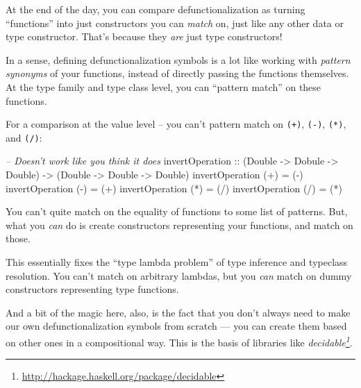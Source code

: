 \documentclass[]{article}
\newenvironment{Shaded}{}{}
\newcommand{\CommentTok}[1]{\textcolor[rgb]{0.38,0.63,0.69}{\textit{#1}}}
\newcommand{\DataTypeTok}[1]{\textcolor[rgb]{0.56,0.13,0.00}{#1}}
\newcommand{\FunctionTok}[1]{\textcolor[rgb]{0.02,0.16,0.49}{#1}}
\newcommand{\NormalTok}[1]{#1}
\newcommand{\OtherTok}[1]{\textcolor[rgb]{0.00,0.44,0.13}{#1}}
\renewcommand{\href}[2]{#2\footnote{\url{#1}}}
\begin{document}
At the end of the day, you can compare defunctionalization as turning
``functions'' into just constructors you can \emph{match} on, just like any
other data or type constructor. That's because they \emph{are} just type
constructors!

In a sense, defining defunctionalization symbols is a lot like working with
\emph{pattern synonyms} of your functions, instead of directly passing the
functions themselves. At the type family and type class level, you can ``pattern
match'' on these functions.

For a comparison at the value level -- you can't pattern match on \texttt{(+)},
\texttt{(-)}, \texttt{(*)}, and \texttt{(/)}:

\begin{Shaded}
\begin{Highlighting}[]
\CommentTok{-- Doesn't work like you think it does}
\OtherTok{invertOperation ::}\NormalTok{ (}\DataTypeTok{Double} \OtherTok{->} \DataTypeTok{Dobule} \OtherTok{->} \DataTypeTok{Double}\NormalTok{) }\OtherTok{->}\NormalTok{ (}\DataTypeTok{Double} \OtherTok{->} \DataTypeTok{Double} \OtherTok{->} \DataTypeTok{Double}\NormalTok{)}
\NormalTok{invertOperation (}\FunctionTok{+}\NormalTok{) }\FunctionTok{=}\NormalTok{ (}\FunctionTok{-}\NormalTok{)}
\NormalTok{invertOperation (}\FunctionTok{-}\NormalTok{) }\FunctionTok{=}\NormalTok{ (}\FunctionTok{+}\NormalTok{)}
\NormalTok{invertOperation (}\FunctionTok{*}\NormalTok{) }\FunctionTok{=}\NormalTok{ (}\FunctionTok{/}\NormalTok{)}
\NormalTok{invertOperation (}\FunctionTok{/}\NormalTok{) }\FunctionTok{=}\NormalTok{ (}\FunctionTok{*}\NormalTok{)}
\end{Highlighting}
\end{Shaded}

You can't quite match on the equality of functions to some list of patterns.
But, what you \emph{can} do is create constructors representing your functions,
and match on those.

This essentially fixes the ``type lambda problem'' of type inference and
typeclass resolution. You can't match on arbitrary lambdas, but you \emph{can}
match on dummy constructors representing type functions.

And a bit of the magic here, also, is the fact that you don't always need to
make our own defunctionalization symbols from scratch --- you can create them
based on other ones in a compositional way. This is the basis of libraries like
\emph{\href{http://hackage.haskell.org/package/decidable}{decidable}}.
\end{document}
